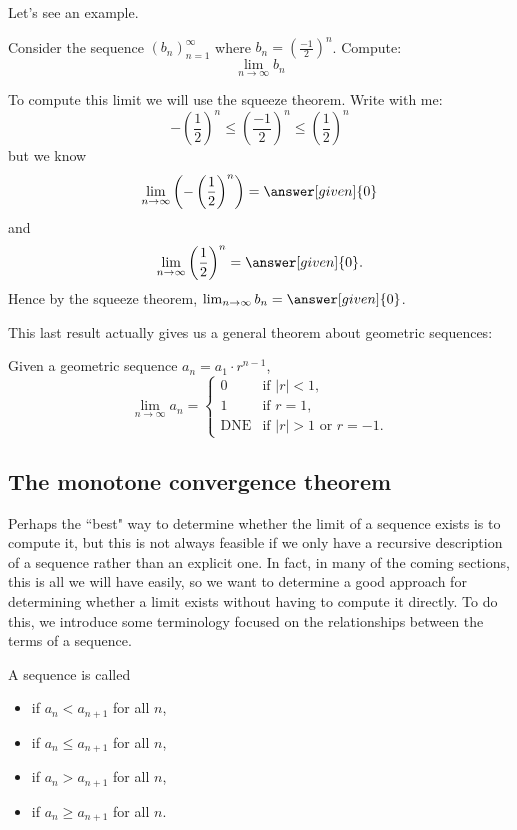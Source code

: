 \documentclass{ximera}
\begin{document}
Let's see an example.

\begin{example}
  Consider the sequence $(b_n)_{n=1}^{\infty}$ where $b_n =
  \left(\frac{-1}{2}\right)^n$. Compute:
  \[
  \lim_{n\to\infty}b_n
  \]
  \begin{explanation}
    To compute this limit we will use the squeeze theorem. Write with
    me:
    \[
    -\left(\frac{1}{2}\right)^n\le \left(\frac{-1}{2}\right)^n \le \left(\frac{1}{2}\right)^n
    \]
    but we know
    \[
    \lim_{n\to \infty}\left(-\left(\frac{1}{2}\right)^n\right) = \answer[given]{0}
    \]
    and
    \[
    \lim_{n\to \infty}\left(\frac{1}{2}\right)^n =\answer[given]{0}.
    \]
    Hence by the squeeze theorem, $\lim_{n\to\infty} b_n = \answer[given]{0}$.
  \end{explanation}
\end{example}


This last result actually gives us a general theorem about geometric
sequences:

\begin{theorem}
  Given a geometric sequence $a_n = a_1 \cdot r^{n-1}$,
  \[
  \lim_{n\to\infty} a_n =
  \begin{cases}
    0 &\text{if $|r|<1$,}\\
    1 &\text{if $r=1$,}\\
    \text{DNE} &\text{if $|r|>1$ or $r=-1$.}
  \end{cases}
  \]
\end{theorem}


\subsection{The monotone convergence theorem}

Perhaps the ``best" way to determine whether the limit of a sequence exists is to compute it, but this is not always feasible if we only have a recursive description of a sequence rather than an explicit one.  In fact, in many of the coming sections, this is all we will have easily, so we want to determine a good approach for determining whether a limit exists without having to compute it directly.  To do this, we introduce some terminology focused on the relationships between the terms of a sequence.

\begin{definition}
  A sequence is called
  \begin{itemize}
    \item {} if $a_n<a_{n+1}$ for all $n$,
    \item {} if $a_n\le a_{n+1}$ for all $n$,
    \item {} if $a_n>a_{n+1}$ for all $n$,
    \item {} if $a_n\ge a_{n+1}$ for all $n$.
  \end{itemize}
\end{definition}
\end{document}
